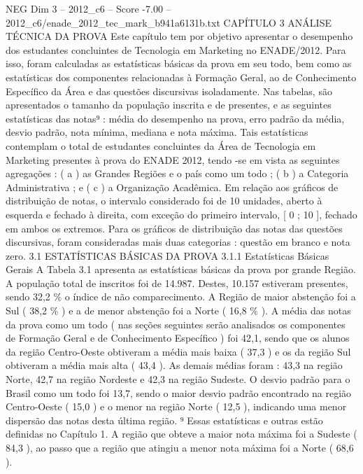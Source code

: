 \begin{textsample}{NEG Dim 3 – 2012\_c6 – Score -7.00 – 2012\_c6/enade\_2012\_tec\_mark\_b941a6131b.txt}  \label{ex:f3_neg_024}
CAPÍTULO 3 ANÁLISE TÉCNICA DA PROVA Este capítulo tem por objetivo apresentar o desempenho dos estudantes concluintes de Tecnologia em Marketing no ENADE/2012.
Para isso, foram calculadas as estatísticas básicas da prova em seu todo, bem como as estatísticas dos componentes relacionadas à Formação Geral, ao de Conhecimento Específico da Área e das questões discursivas isoladamente.
Nas tabelas, são apresentados o tamanho da população inscrita e de presentes, e as seguintes estatísticas das notas⁹ : média do desempenho na prova, erro padrão da média, desvio padrão, nota mínima, mediana e nota máxima.
Tais estatísticas contemplam o total de estudantes concluintes da Área de Tecnologia em Marketing presentes à prova do ENADE 2012, tendo -se em vista as seguintes agregações : ( a ) as Grandes Regiões e o país como um todo ; ( b ) a Categoria Administrativa ; e ( c ) a Organização Acadêmica.
Em relação aos gráficos de distribuição de notas, o intervalo considerado foi de 10 unidades, aberto à esquerda e fechado à direita, com exceção do primeiro intervalo, [ 0 ; 10 ], fechado em ambos os extremos.
Para os gráficos de distribuição das notas das questões discursivas, foram consideradas mais duas categorias : questão em branco e nota zero. 3.1 ESTATÍSTICAS BÁSICAS DA PROVA 3.1.1 Estatísticas Básicas Gerais A Tabela 3.1 apresenta as estatísticas básicas da prova por grande Região.
A população total de inscritos foi de 14.987.
Destes, 10.157 estiveram presentes, sendo 32,2 \% o índice de não comparecimento.
A Região de maior abstenção foi a Sul ( 38,2 \% ) e a de menor abstenção foi a Norte ( 16,8 \% ).
A média das notas da prova como um todo ( nas seções seguintes serão analisados os componentes de Formação Geral e de Conhecimento Específico ) foi 42,1, sendo que os alunos da região Centro-Oeste obtiveram a média mais baixa ( 37,3 ) e os da região Sul obtiveram a média mais alta ( 43,4 ).
As demais médias foram : 43,3 na região Norte, 42,7 na região Nordeste e 42,3 na região Sudeste.
O desvio padrão para o Brasil como um todo foi 13,7, sendo o maior desvio padrão encontrado na região Centro-Oeste ( 15,0 ) e o menor na região Norte ( 12,5 ), indicando uma menor dispersão das notas desta última região. ⁹ Essas estatísticas e outras estão definidas no Capítulo 1.
A região que obteve a maior nota máxima foi a Sudeste ( 84,3 ), ao passo que a região que atingiu a menor nota máxima foi a Norte ( 68,6 ).

\end{textsample}
